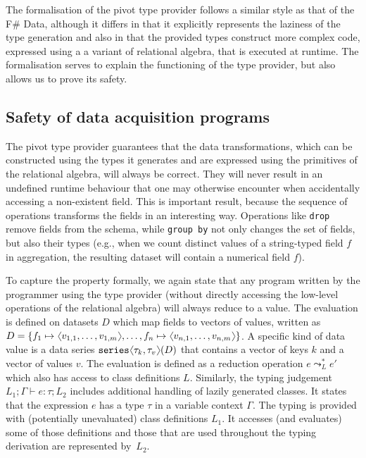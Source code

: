 \documentclass[fleqn,11pt]{report}
\newcommand{\ident}[1]{\textnormal{\ttfamily #1}}
\newcommand{\langl}{\begin{picture}(4.5,7)
\put(1.1,2.5){\rotatebox{60}{\line(1,0){5.5}}}
\put(1.1,2.5){\rotatebox{300}{\line(1,0){5.5}}}
\end{picture}}
\newcommand{\rangl}{\begin{picture}(4.5,7)
\put(.9,2.5){\rotatebox{120}{\line(1,0){5.5}}}
\put(.9,2.5){\rotatebox{240}{\line(1,0){5.5}}}
\end{picture}}
\newcommand{\vect}[1]{\langl #1 \rangl}
\theoremstyle{definition}
\begin{document}
The formalisation of the pivot type provider follows a similar style as that of the F\# Data,
although it differs in that it explicitly represents the laziness of the type generation and
also in that the provided types construct more complex code, expressed using a a variant of
relational algebra, that is executed at runtime. The formalisation serves to explain the functioning
of the type provider, but also allows us to prove its safety.

\subsection{Safety of data acquisition programs}

The pivot type provider guarantees that the data transformations, which can be constructed using
the types it generates and are expressed using the primitives of the relational algebra, will
always be correct. They will never result in an undefined runtime behaviour that one may otherwise
encounter when accidentally accessing a non-existent field. This is important result, because the
sequence of operations transforms the fields in an interesting way. Operations like \texttt{drop}
remove fields from the schema, while \texttt{group by} not only changes the set of fields, but also
their types (e.g., when we count distinct values of a string-typed field $f$ in aggregation,
the resulting dataset will contain a numerical field $f$).

To capture the property formally, we again state that any program written by the programmer using
the type provider (without directly accessing the low-level operations of the relational algebra)
will always reduce to a value. The evaluation is defined on datasets $D$ which
map fields to vectors of values, written as $D =
\{ f_1\mapsto\vect{v_{1,1},\ldots,v_{1,m}}, \ldots, f_n\mapsto\vect{v_{n,1},\ldots,v_{n,m}} \}$.
A specific kind of data value is a data series $\ident{series}\langl\tau_k,\tau_v\rangl(D)$ that
contains a vector of keys $k$ and a vector of values $v$. The evaluation is defined as a reduction
operation $e \leadsto_{L}^{*} e'$ which also has access to class definitions $L$.
Similarly, the typing judgement $L_1;\Gamma \vdash e : \tau; L_2$ includes additional handling of
lazily generated classes. It states that the expression $e$ has a type $\tau$ in a variable context
$\Gamma$. The typing is provided with (potentially unevaluated) class definitions $L_1$. It
accesses (and evaluates) some of those definitions and those that are used throughout the typing
derivation are represented by~$L_2$.
\end{document}
